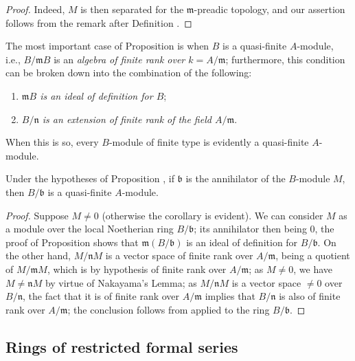 \begin{proof}
\label{proof-0.7.4.3}
Indeed, $M$ is then separated for the $\mathfrak{m}$-preadic topology, and our assertion
follows from the remark after Definition .
\end{proof}

\begin{env}[7.4.4]
\label{0.7.4.4}
The most important case of Proposition  is when $B$ is a
quasi-finite $A$-module, i.e., $B/\mathfrak{m}B$ is an \emph{algebra of finite rank over
$k=A/\mathfrak{m}$}; furthermore, this condition can be broken down into the combination
of the following:
\begin{enumerate}[label=(\roman*)]
  \item \emph{$\mathfrak{m}B$ is an ideal of definition for $B$};
  \item \emph{$B/\mathfrak{n}$ is an extension of finite rank of the field $A/\mathfrak{m}$}.
\end{enumerate}
When this is so, every $B$-module of finite type is evidently a quasi-finite $A$-module.
\end{env}

\begin{corollary}[7.4.5]
\label{0.7.4.5}
Under the hypotheses of Proposition , if
$\mathfrak{b}$ is the annihilator of the $B$-module $M$, then $B/\mathfrak{b}$ is a
quasi-finite $A$-module.
\end{corollary}

\begin{proof}
\label{proof-0.7.4.5}
Suppose $M\neq 0$ (otherwise the corollary is evident). We can consider $M$ as a
module over the local Noetherian ring $B/\mathfrak{b}$; its annihilator then being
$0$, the proof of Proposition  shows that
$\mathfrak{m}(B/\mathfrak{b})$ is an ideal of definition for $B/\mathfrak{b}$.
On the other hand, $M/\mathfrak{n}M$ is a vector space of finite rank over
$A/\mathfrak{m}$, being a quotient of $M/\mathfrak{m}M$, which is by hypothesis of
finite rank over $A/\mathfrak{m}$; as $M\neq 0$, we have $M\neq\mathfrak{n}M$ by
virtue of Nakayama's Lemma; as $M/\mathfrak{n}M$ is a vector space $\neq 0$ over
$B/\mathfrak{n}$, the fact that it is of finite rank over $A/\mathfrak{m}$ implies
that $B/\mathfrak{n}$ is also of finite rank over $A/\mathfrak{m}$; the conclusion
follows from  applied to the ring $B/\mathfrak{b}$.
\end{proof}

\subsection{Rings of restricted formal series}
\label{subsection:0.7.5}

